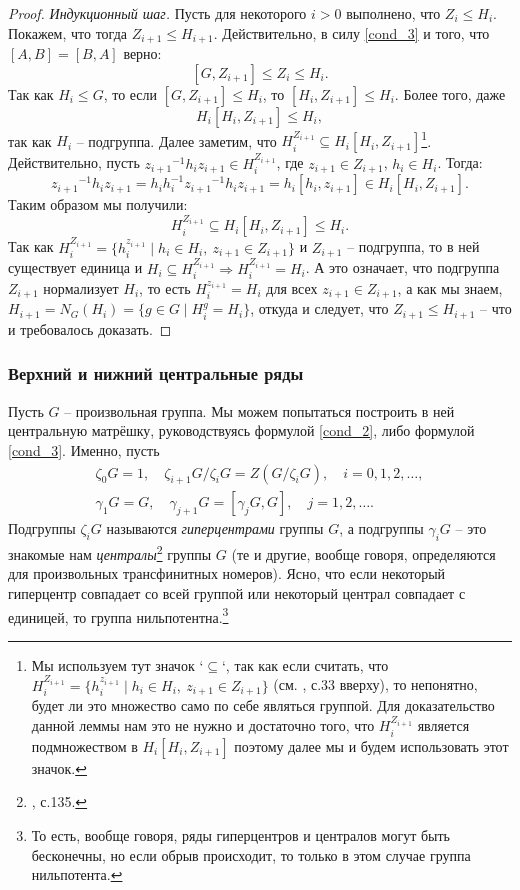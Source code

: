 \documentclass{article}
\begin{document}
\begin{proof}
    \textit{Индукционный шаг.} Пусть для некоторого $i > 0$ выполнено, что $Z_i \leqslant H_i$. Покажем, что тогда $Z_{i + 1} \leqslant H_{i + 1}$. Действительно, в силу \eqref{cond_3} и того, что $[A, B] = [B, A]$ верно: $$ [G, Z_{i + 1}] \leqslant Z_i \leqslant H_i. $$
    Так как $H_i \leqslant G$, то если $[G, Z_{i + 1}] \leqslant H_i$, то $[H_i, Z_{i + 1}] \leqslant H_i$. Более того, даже $$ H_i [H_i, Z_{i + 1}] \leqslant H_i, $$ так как $H_i$ -- подгруппа.
    Далее заметим, что $H_i^{Z_{i + 1}} \subseteq H_i [H_i, Z_{i + 1}]$\footnote{Мы используем тут значок `$\subseteq$`, так как если считать, что $H_i^{Z_{i + 1}} = \{ h_i^{z_{i + 1}} \mid h_i \in H_i, \ z_{i + 1} \in Z_{i + 1} \}$ (см. \cite{kargapolov}, с.33 вверху), то непонятно, будет ли это множество само по себе являться группой. Для доказательство данной леммы нам это не нужно и достаточно того, что $H_i^{Z_{i + 1}}$ является подмножеством в $H_i [H_i, Z_{i + 1}]$ поэтому далее мы и будем использовать этот значок.}. Действительно, пусть $ {z_{i + 1}}^{-1} h_i z_{i + 1} \in H_i^{Z_{i + 1}} $, где $z_{i + 1} \in Z_{i + 1}$, $h_i \in H_i $. Тогда:
    \[
        {z_{i + 1}}^{-1} h_i z_{i + 1} = h_i h_i^{-1} {z_{i + 1}}^{-1} h_i z_{i + 1} = h_i [h_i, z_{i + 1}] \in H_i [H_i, Z_{i + 1}].
    \]
    Таким образом мы получили:
    \[
        H_i^{Z_{i + 1}} \subseteq H_i [H_i, Z_{i + 1}] \leqslant H_i.
    \]
    Так как $H_i^{Z_{i + 1}} = \{ h_i^{z_{i + 1}} \mid h_i \in H_i, \ z_{i + 1} \in Z_{i + 1} \}$ и $Z_{i + 1}$ -- подгруппа, то в ней существует единица и $H_i \subseteq H_i^{Z_{i + 1}} \Rightarrow H_i^{Z_{i + 1}} = H_i$.
    А это означает, что подгруппа $Z_{i + 1}$ нормализует $H_i$, то есть $H_i^{z_{i + 1}} = H_i$ для всех $z_{i + 1} \in Z_{i + 1}$, а как мы знаем, $H_{i + 1} = N_G(H_i) = \{ g \in G \mid H_i^g = H_i \}$, откуда и следует, что $Z_{i + 1} \leqslant H_{i + 1}$ -- что и требовалось доказать.
\end{proof}

\subsubsection{Верхний и нижний центральные ряды}

Пусть $G$ -- произвольная группа. Мы можем попытаться построить в ней центральную матрёшку, руководствуясь формулой \eqref{cond_2}, либо формулой \eqref{cond_3}. Именно, пусть
\begin{gather*}
    \zeta_0 G = 1, \quad \zeta_{i + 1} G / \zeta_i G = Z(G / \zeta_i G), \quad i = 0, 1, 2, \ldots, \\
    \gamma_1G = G,\quad \gamma_{j + 1}G = [\gamma_jG, G], \quad j = 1,2, \ldots.
\end{gather*}
Подгруппы $\zeta_iG$ называются \textit{гиперцентрами} группы $G$, а подгруппы $\gamma_i G$ -- это знакомые нам \textit{централы}\footnote{\cite{kargapolov}, с.135.} группы $G$ (те и другие, вообще говоря, определяются для произвольных трансфинитных номеров). Ясно, что если некоторый гиперцентр совпадает со всей группой или некоторый централ совпадает с единицей, то группа нильпотентна.\footnote{То есть, вообще говоря, ряды гиперцентров и централов могут быть бесконечны, но если обрыв происходит, то только в этом случае группа нильпотента.}
\end{document}
